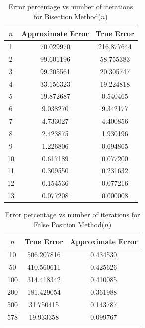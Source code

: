 \documentclass[titlepage, 11pt]{article}
\begin{document}
\begin{table}[!htb]
    \caption{Error percentage vs number of iterations for Bisection Method($n$)}
    \centering
    \begin{tabular}{ccc}
    \toprule
    \textbf{$n$}& \textbf{Approximate Error} &\textbf{True Error} \\
    \midrule
          1 & 70.029970 & 216.877644 \\
          2 & 99.601196 & 58.755383\\
          3 & 99.205561 & 20.305747\\
          4 & 33.156323 & 19.224818\\
          5 & 19.872687 & 0.540465\\
          6 & 9.038270 & 9.342177\\
          7 & 4.733027 & 4.400856\\
          8 & 2.423875 & 1.930196\\
          9 & 1.226806 & 0.694865\\
         10 & 0.617189 & 0.077200\\
         11 & 0.309550 & 0.231632\\ 
         12 & 0.154536 & 0.077216\\
         13 & 0.077208 & 0.000008\\
    \bottomrule
    \end{tabular}
    \label{tab:tab6}
\end{table}

\begin{table}[!htb]
    \caption{Error percentage vs number of iterations for False Position Method($n$)}
    \centering
    \begin{tabular}{ccc}
    \toprule
    \textbf{$n$}& \textbf{True Error} & \textbf{Approximate  Error}\\
    \midrule
          10 & 506.207816 & 0.434530 \\
          50 & 410.560611 & 0.425626 \\
          100 & 314.418342 & 0.410085 \\
          200 & 181.429054 & 0.361988 \\
          500 & 31.750415 & 0.143787 \\
          578 & 19.933358 & 0.099767 \\
    \bottomrule
    \end{tabular}
    \label{tab:tab86}
\end{table}

\end{document}
